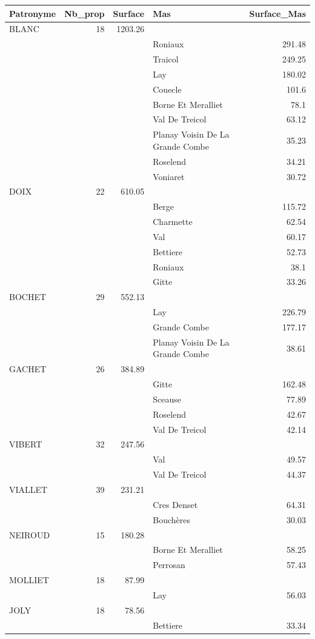 
\begin{tabular}{lrrlr}
\toprule
Patronyme & Nb_prop & Surface & Mas & Surface_Mas\\
\midrule
BLANC & 18 & 1203.26 &  & \\
 &  &  & Roniaux & 291.48\\
 &  &  & Traicol & 249.25\\
 &  &  & Lay & 180.02\\
 &  &  & Couecle & 101.6\\
\addlinespace
 &  &  & Borne Et Meralliet & 78.1\\
 &  &  & Val De Treicol & 63.12\\
 &  &  & Planay Voisin De La Grande Combe & 35.23\\
 &  &  & Roselend & 34.21\\
 &  &  & Voniaret & 30.72\\
\addlinespace
DOIX & 22 & 610.05 &  & \\
 &  &  & Berge & 115.72\\
 &  &  & Charmette & 62.54\\
 &  &  & Val & 60.17\\
 &  &  & Bettiere & 52.73\\
\addlinespace
 &  &  & Roniaux & 38.1\\
 &  &  & Gitte & 33.26\\
BOCHET & 29 & 552.13 &  & \\
 &  &  & Lay & 226.79\\
 &  &  & Grande Combe & 177.17\\
\addlinespace
 &  &  & Planay Voisin De La Grande Combe & 38.61\\
GACHET & 26 & 384.89 &  & \\
 &  &  & Gitte & 162.48\\
 &  &  & Sceause & 77.89\\
 &  &  & Roselend & 42.67\\
\addlinespace
 &  &  & Val De Treicol & 42.14\\
VIBERT & 32 & 247.56 &  & \\
 &  &  & Val & 49.57\\
 &  &  & Val De Treicol & 44.37\\
VIALLET & 39 & 231.21 &  & \\
\addlinespace
 &  &  & Cres Denset & 64.31\\
 &  &  & Bouchères & 30.03\\
NEIROUD & 15 & 180.28 &  & \\
 &  &  & Borne Et Meralliet & 58.25\\
 &  &  & Perrosan & 57.43\\
\addlinespace
MOLLIET & 18 & 87.99 &  & \\
 &  &  & Lay & 56.03\\
JOLY & 18 & 78.56 &  & \\
 &  &  & Bettiere & 33.34\\
\bottomrule
\end{tabular}
